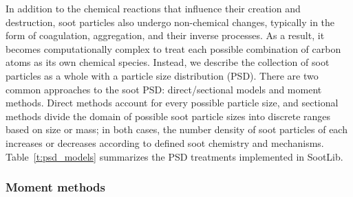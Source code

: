 \documentclass[preprint,letterpaper]{elsarticle}
\begin{document}
In addition to the chemical reactions that influence their creation and destruction, soot particles also undergo non-chemical changes, typically in the form of coagulation, aggregation, and their inverse processes. As a result, it becomes computationally complex to treat each possible combination of carbon atoms as its own chemical species. Instead, we describe the collection of soot particles as a whole with a particle size distribution (PSD). There are two common approaches to the soot PSD: direct/sectional models and moment methods. Direct methods account for every possible particle size, and sectional methods divide the domain of possible soot particle sizes into discrete ranges based on size or mass; in both cases, the number density of soot particles of each increases or decreases according to defined soot chemistry and mechanisms. Table~\ref{t:psd_models} summarizes the PSD treatments implemented in SootLib.
%
\begin{table}[h]
    \caption{Summary of soot particle size distribution models implemented in SootLib.}
    \label{t:psd_models}
    \centering
\end{table}
%

\subsubsection{Moment methods}
\label{s:moment-methods}
\end{document}
